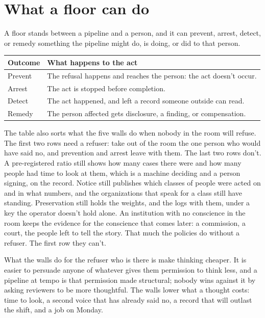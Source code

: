 \section{What a floor can do}
\label{sec:4.1}
A floor stands between a pipeline and a person, and it can prevent, arrest, detect, or remedy something the pipeline might do, is doing, or did to that person.

\begingroup\small\renewcommand{\arraystretch}{1.12}
\begin{longtable}{@{}>{\raggedright\arraybackslash}p{}>{\raggedright\arraybackslash}p{}@{}}
\hline
\textbf{Outcome} & \textbf{What happens to the act} \\
\hline
\endhead
Prevent & The refusal happens and reaches the person: the act doesn't occur. \\ \hline
Arrest & The act is stopped before completion. \\ \hline
Detect & The act happened, and left a record someone outside can read. \\ \hline
Remedy & The person affected gets disclosure, a finding, or compensation. \\ \hline
\end{longtable}
\endgroup

The table also sorts what the five walls do when nobody in the room will refuse. The first two rows need a refuser: take out of the room the one person who would have said no, and prevention and arrest leave with them. The last two rows don't. A pre-registered ratio still shows how many cases there were and how many people had time to look at them, which is a machine deciding and a person signing, on the record. Notice still publishes which classes of people were acted on and in what numbers, and the organizations that speak for a class still have standing. Preservation still holds the weights, and the logs with them, under a key the operator doesn't hold alone. An institution with no conscience in the room keeps the evidence for the conscience that comes later: a commission, a court, the people left to tell the story. That much the policies do without a refuser. The first row they can't.

What the walls do for the refuser who is there is make thinking cheaper. It is easier to persuade anyone of whatever gives them permission to think less, and a pipeline at tempo is that permission made structural; nobody wins against it by asking reviewers to be more thoughtful. The walls lower what a thought costs: time to look, a second voice that has already said no, a record that will outlast the shift, and a job on Monday.
